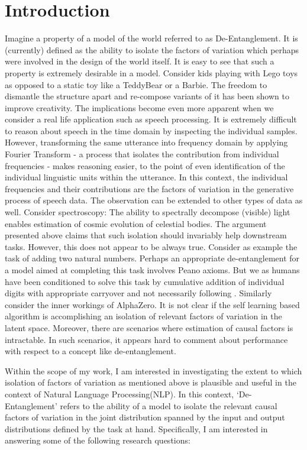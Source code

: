 \chapter{Introduction}

Imagine a property of a model of the world referred to as De-Entanglement. It is (currently) defined as the ability to isolate the factors of variation which perhaps were involved in the design of the world itself. It is easy to see that such a property is extremely desirable in a model. Consider kids playing with Lego toys as opposed to a static toy like a TeddyBear or a Barbie. The freedom to dismantle the structure apart and re-compose variants of it has been shown to improve creativity\citep{gauntlett2014lego}. The implications become even more apparent when we consider a real life application such as speech processing. It is extremely difficult to reason about speech in the time domain by inspecting the individual samples. However, transforming the same utterance into frequency domain by applying Fourier Transform - a process that isolates the contribution from individual frequencies - makes reasoning easier, to the point of even identification of the individual linguistic units within the utterance. In this context, the individual frequencies and their contributions are the factors of variation in the generative process of speech data. The observation can be extended to other types of data as well. Consider spectroscopy: The ability to spectrally decompose (visible) light enables estimation of cosmic evolution of celestial bodies\citep{stellar_evolution}. The argument presented above claims that such isolation should invariably help downstream tasks. However, this does not appear to be always true. Consider as example the task of adding two natural numbers. Perhaps an appropriate de-entanglement for a model aimed at completing this task involves Peano axioms\citep{peano_axioms}. But we as humans have been conditioned to solve this task by cumulative addition of individual digits with appropriate carryover and not necessarily following \citep{peano_axioms}. Similarly consider  the inner workings of AlphaZero\citep{alpha_zero_withouthumans}. It is not clear if the self learning based algorithm is accomplishing an isolation of relevant factors of variation in the latent space. Moreover, there are scenarios where estimation of causal factors is intractable. In such scenarios, it appears hard to comment about performance with respect to a concept like de-entanglement. 

Within the scope of my work, I am interested in investigating the extent to which  isolation of factors of variation as mentioned above is plausible and useful in the context of Natural Language Processing(NLP). In this context, `De-Entanglement' refers to the ability of a model to isolate the relevant causal factors of variation in the joint distribution spanned by the input and output distributions defined by the task at hand. Specifically, I am interested in answering some of the following research questions:

